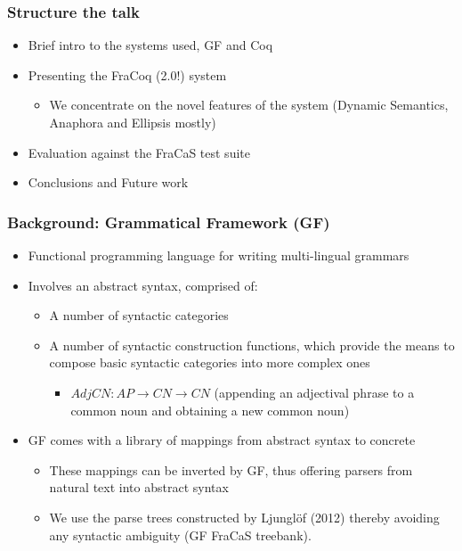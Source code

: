 \documentclass[11pt]{beamer}
\author{Jean-Philippe Bernardy and Stergios Chatzikyriakidis}
\begin{document}
\date{October 2019}
\frame{\titlepage}


\begin{frame}
  \frametitle{Structure the talk}
  \begin{itemize}
  \item Brief intro to the systems used, GF and Coq
  \item Presenting the FraCoq (2.0!) system
    \begin{itemize}
    \item We concentrate on the novel features of the system (Dynamic Semantics, Anaphora
      and Ellipsis mostly)
    \end{itemize}
  \item Evaluation against the FraCaS test suite
  \item Conclusions and Future work
  \end{itemize}
\end{frame}


\begin{frame} \frametitle{Background: Grammatical Framework (GF)}
  \begin{itemize}
  \item Functional programming language for writing multi-lingual
grammars
  \item Involves an abstract syntax, comprised of:
    \begin{itemize}
    \item A number of syntactic categories
    \item A number of syntactic construction functions, which provide
the means to compose basic syntactic categories into more complex ones
      \begin{itemize}
      \item $AdjCN : AP \to CN \to CN$ (appending an adjectival phrase to
a common noun and obtaining a new common noun)
      \end{itemize}\end{itemize}
  \item GF comes with a library of mappings from abstract syntax to
concrete
    \begin{itemize}
    \item These mappings can be inverted by GF, thus offering parsers
from natural text into abstract syntax

    \item We use the parse trees constructed by Ljungl\"of (2012)
thereby avoiding any syntactic ambiguity (GF FraCaS
treebank).\end{itemize}\end{itemize}
\end{frame}
\end{document}
